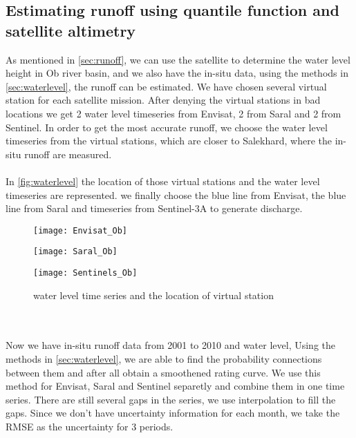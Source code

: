 \subsection{Estimating runoff using quantile function and satellite altimetry}
 As mentioned in \autoref{sec:runoff}, we can use the satellite to determine the water level height in Ob river basin, and we also have the in-situ data, using the methods in \autoref{sec:waterlevel}, the runoff can be estimated. We have chosen several virtual station for each satellite mission. After denying the virtual stations in bad locations we get 2 water level timeseries from Envisat, 2 from Saral and 2 from Sentinel. In order to get the most accurate runoff, we choose the water level timeseries from the virtual stations, which are closer to Salekhard, where the in-situ runoff are measured. \\\\
 In \autoref{fig:waterlevel} the location of those virtual stations and the water level timeseries are represented. we finally choose the blue line from Envisat, the blue line from Saral and timeseries from Sentinel-3A to generate discharge.
 \begin{figure}[htbp]
 	\centering
 	\begin{minipage}[t]{0.7\textwidth}
 		\centering
 		\texttt{[image: Envisat\_Ob]} %
 	\end{minipage}
 	\begin{minipage}[t]{0.7\textwidth}
 		\centering
 		\texttt{[image: Saral\_Ob]} %
 	\end{minipage}
 \begin{minipage}[t]{0.7\textwidth}
 	\centering
 	\texttt{[image: Sentinels\_Ob]} %
 \end{minipage}
 \caption{water level time series and the location of virtual station}
 \label{fig:waterlevel}
 \end{figure}
\\\\
Now we have in-situ runoff data from 2001 to 2010 and water level, Using the methods in \autoref{sec:waterlevel}, we are able to find the probability connections between them and after all obtain a smoothened rating curve. We use this method for Envisat, Saral and Sentinel separetly and combine them in one time series. There are still several gaps in the series, we use interpolation to fill the gaps. Since we don't have uncertainty information for each month, we take the RMSE as the uncertainty for 3 periods.  
